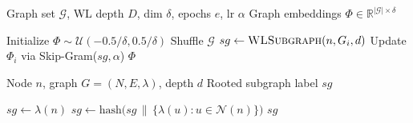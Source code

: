 \begin{algorithm}[t]
\footnotesize
\caption{Graph2Vec}
\label{alg:graph2vec}
\begin{algorithmic}[1]
\Require Graph set $\mathcal{G}$, WL depth $D$, dim $\delta$, epochs $e$, lr $\alpha$
\Ensure Graph embeddings $\Phi \in \mathbb{R}^{|\mathcal{G}| \times \delta}$

\State Initialize $\Phi \sim \mathcal{U}(-0.5/\delta, 0.5/\delta)$
  \State Shuffle $\mathcal{G}$
        \State $sg \gets \textsc{WLSubgraph}(n,G_i,d)$
        \State Update $\Phi_i$ via Skip-Gram($sg,\alpha$)
      \EndFor
    \EndFor
  \EndFor
\EndFor
\State \Return $\Phi$
\end{algorithmic}
\end{algorithm}



\begin{algorithm}[t]
\footnotesize
\caption{WLSubgraph}
\label{alg:getwlsubgraph}
\begin{algorithmic}[1]
\Require Node $n$, graph $G=(N,E,\lambda)$, depth $d$
\Ensure Rooted subgraph label $sg$

\State $sg \gets \lambda(n)$
  \State $sg \gets \text{hash}\big(sg \,\|\, \{\lambda(u): u \in \mathcal{N}(n)\}\big)$
\EndFor
\State \Return $sg$
\end{algorithmic}
\end{algorithm}


